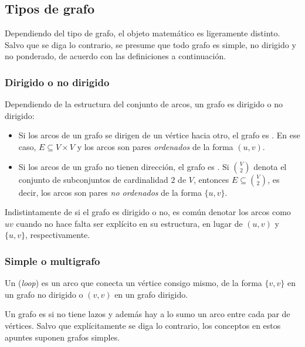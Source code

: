 
\subsection{Tipos de grafo}
\label{sec:tipos_de_grafo}

Dependiendo del tipo de grafo, el objeto matemático es ligeramente distinto. Salvo que se diga lo contrario, se presume que todo grafo es simple, no dirigido y no ponderado, de acuerdo con las definiciones a continuación.

\subsubsection{Dirigido o no dirigido}
\label{sec:dirigido_vs_no_dirigido}

Dependiendo de la estructura del conjunto de arcos, un grafo es dirigido o no dirigido:

\begin{itemize}
  \item Si los arcos de un grafo se dirigen de un vértice hacia otro, el grafo es . En ese caso, \(E \subseteq V \times V\) y los arcos son pares \emph{ordenados} de la forma \((u,v)\).
  \item Si los arcos de un grafo no tienen dirección, el grafo es . Si \(\binom{V}{2}\) denota el conjunto de subconjuntos de cardinalidad \(2\) de \(V\), entonces \(E \subseteq \binom{V}{2}\), es decir, los arcos son pares \emph{no ordenados} de la forma \(\{u,v\}\).
\end{itemize}

Indistintamente de si el grafo es dirigido o no, es común denotar los arcos como \(uv\) cuando no hace falta ser explícito en su estructura, en lugar de \((u,v)\) y \(\{u,v\}\), respectivamente.

\subsubsection{Simple o multigrafo}
\label{sec:simple_o_multigrafo}

Un  (\textit{loop}) es un arco que conecta un vértice consigo mismo, de la forma \(\{v, v\}\) en un grafo no dirigido o \((v, v)\) en un grafo dirigido.

Un grafo es  si no tiene lazos y además hay a lo sumo un arco entre cada par de vértices. Salvo que explícitamente se diga lo contrario, los conceptos en estos apuntes suponen grafos simples.

